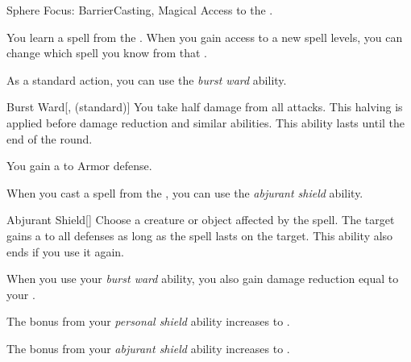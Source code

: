     \begin{feat}{Sphere Focus: Barrier}{Casting, Magical}
        \featpre Access to the  .

         You learn a spell from the  .
        When you gain access to a new spell levels, you can change which spell you know from that .

         As a standard action, you can use the \textit{burst ward} ability.
        \begin{ability}{Burst Ward}[,  (standard)]
            You take half damage from all attacks.
            This halving is applied before damage reduction and similar abilities.
            This ability lasts until the end of the round.
        \end{ability}

         You gain a   to Armor defense.

         When you cast a spell from the  , you can use the \textit{abjurant shield} ability.
        \begin{ability}{Abjurant Shield}[]
            Choose a creature or object affected by the spell.
            The target gains a   to all defenses as long as the spell lasts on the target.
            This ability also ends if you use it again.
        \end{ability}

         When you use your \textit{burst ward} ability, you also gain damage reduction equal to your .

         The bonus from your \textit{personal shield} ability increases to .

         The bonus from your \textit{abjurant shield} ability increases to .
    \end{feat}

